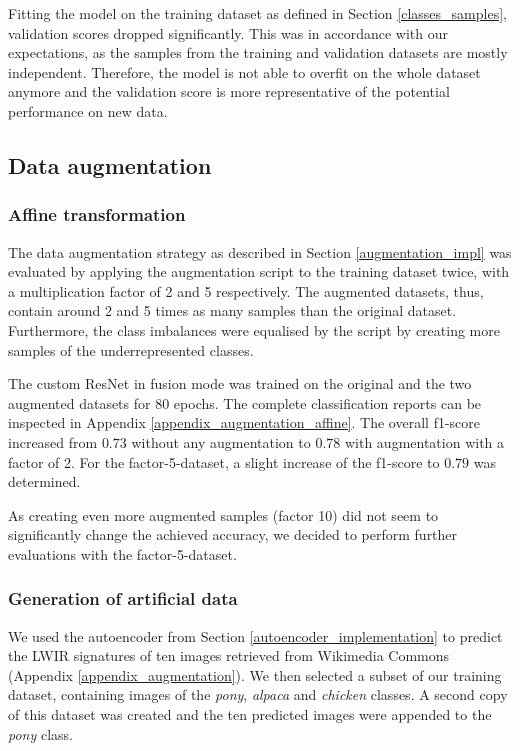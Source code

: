 \documentclass{l4proj}
\begin{document}
Fitting the model on the training dataset as defined in Section \ref{classes_samples}, validation scores dropped significantly. This was in accordance with our expectations, as the samples from the training and validation datasets are mostly independent. Therefore, the model is not able to overfit on the whole dataset anymore and the validation score is more representative of the potential performance on new data.

\subsection{Data augmentation}

\subsubsection{Affine transformation}

The data augmentation strategy as described in Section \ref{augmentation_impl} was evaluated by applying the augmentation script to the training dataset twice, with a multiplication factor of 2 and 5 respectively. The augmented datasets, thus, contain around 2 and 5 times as many samples than the original dataset. Furthermore, the class imbalances were equalised by the script by creating more samples of the underrepresented classes.

The custom ResNet in fusion mode was trained on the original and the two augmented datasets for 80 epochs. The complete classification reports can be inspected in Appendix \ref{appendix_augmentation_affine}. The overall f1-score increased from $0.73$ without any augmentation to $0.78$ with augmentation with a factor of 2. For the factor-5-dataset, a slight increase of the f1-score to $0.79$ was determined. 

As creating even more augmented samples (factor 10) did not seem to significantly change the achieved accuracy, we decided to perform further evaluations with the factor-5-dataset.

\subsubsection{Generation of artificial data}

We used the autoencoder from Section \ref{autoencoder_implementation} to predict the LWIR signatures of ten images retrieved from Wikimedia Commons (Appendix \ref{appendix_augmentation}). We then selected a subset of our training dataset, containing images of the \textit{pony}, \textit{alpaca} and \textit{chicken} classes. A second copy of this dataset was created and the ten predicted images were appended to the \textit{pony} class.
\end{document}
